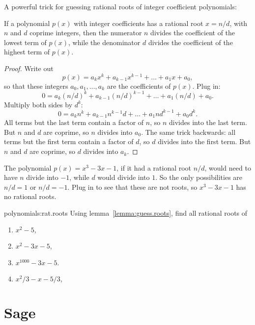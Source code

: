 A powerful trick for guessing rational roots of integer coefficient polynomials:
\begin{lemma}\label{lemma:guess.roots}
If a polynomial \(p(x)\) with integer coefficients has a rational root \(x=n/d\), with \(n\) and \(d\) coprime integers, then the numerator \(n\) divides the coefficient of the lowest term of \(p(x)\), while the denominator \(d\) divides the coefficient of the highest term of \(p(x)\).
\end{lemma}
\begin{proof}
Write out 
\[
p(x)=a_k x^k + a_{k-1} x^{k-1} + \dots + a_1 x + a_0,
\]
so that these integers \(a_0, a_1, \dots, a_k\) are the coefficients of \(p(x)\).
Plug in:
\[
0 = a_k (n/d)^k + a_{k-1} (n/d)^{k-1} + \dots + a_1 (n/d) + a_0.
\]
Multiply both sides by \(d^k\):
\[
0 = a_k n^k + a_{k-1} n^{k-1} d  + \dots + a_1 n d^{k-1} + a_0 d^k.
\]
All terms but the last term contain a factor of \(n\), so \(n\) divides into the last term.
But \(n\) and \(d\) are coprime, so \(n\) divides into \(a_0\).
The same trick backwards: all terms but the first term contain a factor of \(d\), so \(d\) divides into the first term.
But \(n\) and \(d\) are coprime, so \(d\) divides into \(a_k\).
\end{proof}

\begin{example}\label{example:x.cubed}
The polynomial \(p(x)=x^3-3x-1\), if it had a rational root \(n/d\), would need to have \(n\) divide into \(-1\), while \(d\) would divide into \(1\).
So the only possibilities are \(n/d=1\) or \(n/d=-1\).
Plug in to see that these are not roots, so \(x^3-3x-1\) has no rational roots.
\end{example}

\begin{problem}{polynomials:rat.roots}
Using lemma~\vref{lemma:guess.roots}, find all rational roots of 
\begin{enumerate}
\item
\(x^2-5\),
\item
\(x^2-3x-5\),
\item
\(x^{1000}-3x-5\).
\item
\(x^2/3-x-5/3\),
\end{enumerate}
\end{problem}



\section{Sage}

